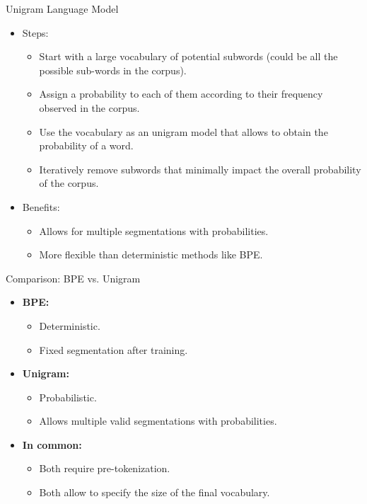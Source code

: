 \documentclass{beamer}
\begin{document}
\begin{frame}{Unigram Language Model}
    \begin{itemize}
        \item Steps:
        \begin{itemize}
            \item Start with a large vocabulary of potential subwords (could be all the possible sub-words in the corpus).
            \item Assign a probability to each of them according to their frequency observed in the corpus.
            \item Use the vocabulary as an unigram model that allows to obtain the probability of a word.
            \item Iteratively remove subwords that minimally impact the overall probability of the corpus.
        \end{itemize}
        \item Benefits:
        \begin{itemize}
            \item Allows for multiple segmentations with probabilities.
            \item More flexible than deterministic methods like BPE.
        \end{itemize}
    \end{itemize}
\end{frame}

\begin{frame}{Comparison: BPE vs. Unigram}
    \begin{itemize}
        \item \textbf{BPE:}
        \begin{itemize}
            \item Deterministic.
            \item Fixed segmentation after training.
        \end{itemize}
        \item \textbf{Unigram:}
        \begin{itemize}
            \item Probabilistic.
            \item Allows multiple valid segmentations with probabilities.
        \end{itemize}
        \item \textbf{In common:}
        \begin{itemize}
            \item Both require pre-tokenization.
            \item Both allow to specify the size of the final vocabulary.
        \end{itemize}
        
    \end{itemize}
\end{frame}
\end{document}
